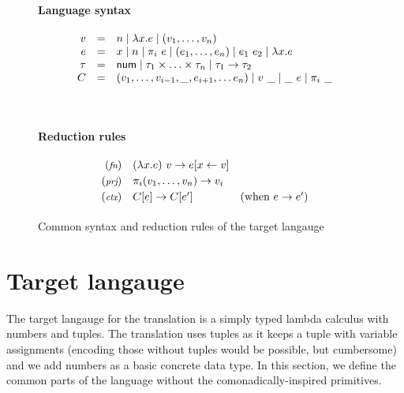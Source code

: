 \begin{figure}[t]
\paragraph{Language syntax}  
\begin{equation*}
\begin{array}{rcl}
  v &  = & n \; | \; \lambda x.e \; | \; (v_1, \ldots, v_n) \\
  e &  = & x \; | \; n \; | \; \pi_i~e \; | \; (e_1, \ldots, e_n) \; | \; e_1~e_2 \; | \; \lambda x.e \\
  \tau &  = & \textnormal{\sffamily num} \; | \; \tau_1 \times \ldots \times \tau_n \; | \; \tau_1 \rightarrow \tau_2 \\
  C  & = & (v_1, \ldots, v_{i-1}, \_, e_{i+1}, \ldots e_n) \; | \; v~\_ \; | \; \_~e \; | \; \pi_i~\_ 
  
\end{array}
\end{equation*}

~
\paragraph{Reduction rules}
\begin{equation*}
\begin{array}{rll}
  \footnotesize{(\emph{fn})}  & (\lambda x.e)~v \rightarrow e[x\leftarrow v] \\[0.25em]
  \footnotesize{(\emph{prj})} & \pi_i (v_1, \ldots, v_n) \rightarrow v_i\\[0.25em]
  \footnotesize{(\emph{ctx})}  & C[e] \rightarrow C[e']  & (\textnormal{when}~e\rightarrow e')\\[0.25em]
\end{array}
\end{equation*}

\caption{Common syntax and reduction rules of the target langauge}
\label{fig:transl-target}
\end{figure}


\section{Target langauge}

The target langauge for the translation is a simply typed lambda calculus with numbers and tuples.
The translation uses tuples as it keeps a tuple with variable assignments (encoding those without 
tuples would be possible, but cumbersome) and we add numbers as a basic concrete data type.
In this section, we define the common parts of the language without the comonadically-inspired
primitives.

